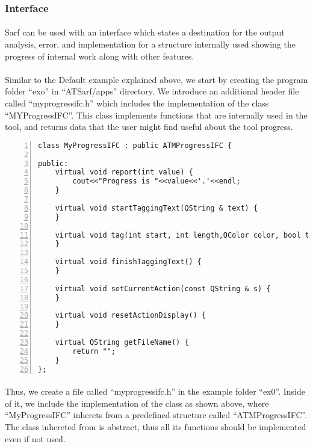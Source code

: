 \documentclass{article}
\begin{document}
\subsubsection{Interface}
\label{subsubsec:interface}

\paragraph{}
Sarf can be used with an interface which states a destination for the output analysis, error, and implementation for a structure internally used showing the progress of internal work along with other features.

\paragraph{}
Similar to the Default example explained above, we start by creating the program folder ``exo'' in ``ATSarf/apps'' directory. We introduce an additional header file called ``myprogressifc.h'' which includes the implementation of the class ``MYProgressIFC''. This class implements functions that are internally used in the tool, and returns data that the user might find useful about the tool progress.

\label{vrbtm:myprogressifc}
\begin{Verbatim}[numbers=left]
class MyProgressIFC : public ATMProgressIFC {

public:
    virtual void report(int value) {
        cout<<"Progress is "<<value<<'.'<<endl;
    }

    virtual void startTaggingText(QString & text) {
    }

    virtual void tag(int start, int length,QColor color, bool textcolor=true) {
    }

    virtual void finishTaggingText() {
    }

    virtual void setCurrentAction(const QString & s) {
    }

    virtual void resetActionDisplay() {
    }

    virtual QString getFileName() {
        return "";
    }
};
\end{Verbatim}

\paragraph{}
Thus, we create a file called ``myprogressifc.h'' in the example folder ``ex0''. Inside of it, we include the implementation of the class as shown above, where ``MyProgressIFC'' inherets from a predefined structure called ``ATMProgressIFC''. The class inhereted from is abstract, thus all its functions should be implemented even if not used.
\end{document}
